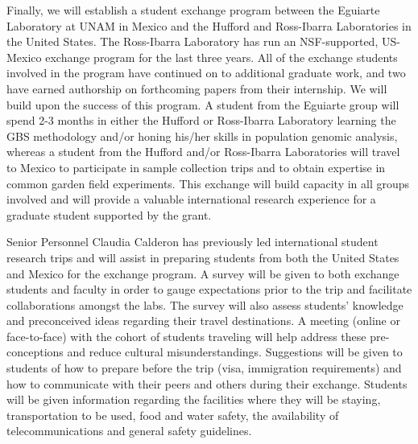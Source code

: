 Finally, we will establish a student exchange program between the Eguiarte Laboratory at UNAM in Mexico and the Hufford and Ross-Ibarra Laboratories in the United States. The Ross-Ibarra Laboratory has run an NSF-supported, US-Mexico exchange program for the last three years.  All of the exchange students involved in the program have continued on to additional graduate work, and two have earned authorship on forthcoming papers from their internship.  We will build upon the success of this program.  A student from the Eguiarte group will spend 2-3 months in either the Hufford or Ross-Ibarra Laboratory learning the GBS methodology and/or honing his/her skills in population genomic analysis, whereas a student from the Hufford and/or Ross-Ibarra Laboratories will travel to Mexico to participate in sample collection trips and to obtain expertise in common garden field experiments. This exchange will build capacity in all groups involved and will provide a valuable international research experience for a graduate student supported by the grant.  

Senior Personnel Claudia Calderon has previously led international student research trips and will assist in preparing students from both the United States and Mexico for the exchange program. A survey will be given to both exchange students and faculty in order to gauge expectations prior to the trip and facilitate collaborations amongst the labs.  The survey will also assess students' knowledge and preconceived ideas  regarding their travel destinations.  A meeting (online or face-to-face) with the cohort of students traveling will help address these pre-conceptions and reduce cultural misunderstandings.  Suggestions will be given to students of how to prepare before the trip (visa, immigration requirements) and how to communicate with their peers and others during their exchange.  Students will be given information regarding the facilities where they will be staying, transportation to be used, food and water safety, the availability of telecommunications and general safety guidelines.



